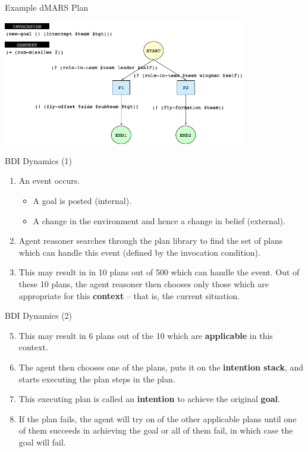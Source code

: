 \documentclass[aspectratio=1610,xcolor=dvipsnames,t]{beamer}
\begin{document}
\begin{frame}{Example dMARS Plan} 
    \begin{center} 
        \includegraphics[width=0.8\textwidth]{dmars} 
    \end{center} 
\end{frame} 

\begin{frame}{BDI Dynamics (1)}
    \begin{enumerate}
        \item An event occurs.
            \begin{itemize} 
                \item A goal is posted (internal).
                \item A change in the environment and hence a change in 
                      belief (external). 
            \end{itemize} 
        \item Agent reasoner searches through the plan library to
              find the set of plans which can handle this event
              (defined by the invocation condition).
        \item This may result in in 10 plans out of 500 which can
              handle the event. Out of these 10 plans, the agent
              reasoner then chooses only those which are 
              appropriate for this \textbf{context} -- that is, 
              the current situation. 
    \end{enumerate} 
\end{frame} 

\begin{frame}{BDI Dynamics (2)}
    \begin{enumerate}
        \setcounter{enumi}{4}
        \item This may result in 6 plans out of the 10 which are
              \textbf{applicable} in this context. 
        \item The agent then chooses one of the plans, puts it on the
              \textbf{intention stack}, and starts executing the plan
              steps in the plan.
        \item This executing plan is called an \textbf{intention} to 
              achieve the original \textbf{goal}. 
        \item If the plan fails, the agent will try on of the other
              applicable plans until one of them succeeds in 
              achieving the goal or all of them fail, in which case
              the goal will fail.
    \end{enumerate} 
\end{frame} 
\end{document}
